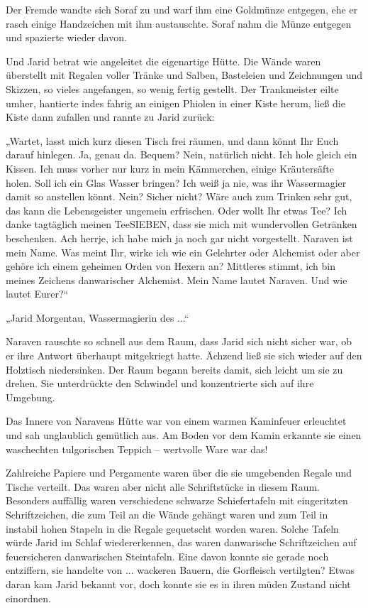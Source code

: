 Der Fremde wandte sich Soraf zu und warf ihm eine Goldmünze entgegen, ehe er rasch einige Handzeichen mit ihm austauschte. Soraf nahm die Münze entgegen und spazierte wieder davon.

Und Jarid betrat wie angeleitet die eigenartige Hütte. Die Wände waren überstellt mit Regalen voller Tränke und Salben, Basteleien und Zeichnungen und Skizzen, so vieles angefangen, so wenig fertig gestellt. Der Trankmeister eilte umher, hantierte indes fahrig an einigen Phiolen in einer Kiste herum, ließ die Kiste dann zufallen und rannte zu Jarid zurück:

„Wartet, lasst mich kurz diesen Tisch frei räumen, und dann könnt Ihr Euch darauf hinlegen. Ja, genau da. Bequem? Nein, natürlich nicht. Ich hole gleich ein Kissen. Ich muss vorher nur kurz in mein Kämmerchen, einige Kräutersäfte holen. Soll ich ein Glas Wasser bringen? Ich weiß ja nie, was ihr Wassermagier damit so anstellen könnt. Nein? Sicher nicht? Wäre auch zum Trinken sehr gut, das kann die Lebensgeister ungemein erfrischen. Oder wollt Ihr etwas Tee? Ich danke tagtäglich meinen TeeSIEBEN, dass sie mich mit wundervollen Getränken beschenken. Ach herrje, ich habe mich ja noch gar nicht vorgestellt. Naraven ist mein Name. Was meint Ihr, wirke ich wie ein Gelehrter oder Alchemist oder aber gehöre ich einem geheimen Orden von Hexern an? Mittleres stimmt, ich bin meines Zeichens danwarischer Alchemist. Mein Name lautet Naraven. Und wie lautet Eurer?“

„Jarid Morgentau, Wassermagierin des ...“

Naraven rauschte so schnell aus dem Raum, dass Jarid sich nicht sicher war, ob er ihre Antwort überhaupt mitgekriegt hatte. Ächzend ließ sie sich wieder auf den Holztisch niedersinken. Der Raum begann bereits damit, sich leicht um sie zu drehen. Sie unterdrückte den Schwindel und konzentrierte sich auf ihre Umgebung.

Das Innere von Naravens Hütte war von einem warmen Kaminfeuer erleuchtet und sah unglaublich gemütlich aus. Am Boden vor dem Kamin erkannte sie einen waschechten tulgorischen Teppich – wertvolle Ware war das!

Zahlreiche Papiere und Pergamente waren über die sie umgebenden Regale und Tische verteilt. Das waren aber nicht alle Schriftstücke in diesem Raum. Besonders auffällig waren verschiedene schwarze Schiefertafeln mit eingeritzten Schriftzeichen, die zum Teil an die Wände gehängt waren und zum Teil in instabil hohen Stapeln in die Regale gequetscht worden waren. Solche Tafeln würde Jarid im Schlaf wiedererkennen, das waren danwarische Schriftzeichen auf feuersicheren danwarischen Steintafeln. Eine davon konnte sie gerade noch entziffern, sie handelte von ... wackeren Bauern, die Gorfleisch vertilgten? Etwas daran kam Jarid bekannt vor, doch konnte sie es in ihren müden Zustand nicht einordnen.

